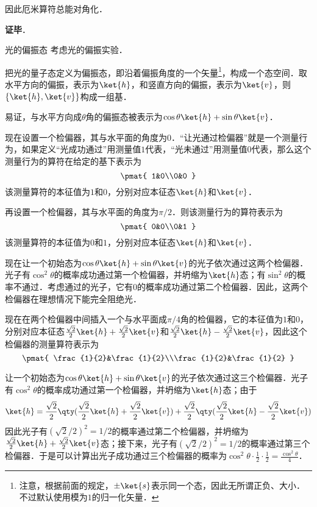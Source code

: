 因此厄米算符总能对角化．

\textbf{证毕}．







\begin{example}{光的偏振态}\label{QMPrcp_ex3}
考虑光的偏振实验．

把光的量子态定义为偏振态，即沿着偏振角度的一个矢量\footnote{注意，根据前面的规定，$\pm\ket{s}$表示同一个态，因此无所谓正负、大小．不过默认使用模为$1$的归一化矢量．}，构成一个态空间．取水平方向的偏振，表示为$\ket{h}$，和竖直方向的偏振，表示为$\ket{v}$，则$\{\ket{h}, \ket{v}\}$构成一组基．

易证，与水平方向成$\theta$角的偏振态被表示为$\cos\theta\ket{h}+\sin\theta\ket{v}$．

现在设置一个检偏器，其与水平面的角度为$0$．“让光通过检偏器”就是一个测量行为，如果定义“光成功通过”用测量值$1$代表，“光未通过”用测量值$0$代表，那么这个测量行为的算符在给定的基下表示为
\begin{equation}
\pmat{
    1&0\\0&0
}
\end{equation}
该测量算符的本征值为$1$和$0$，分别对应本征态$\ket{h}$和$\ket{v}$．

再设置一个检偏器，其与水平面的角度为$\pi/2$．则该测量行为的算符表示为
\begin{equation}
\pmat{
    0&0\\0&1
}
\end{equation}
该测量算符的本征值为$0$和$1$，分别对应本征态$\ket{h}$和$\ket{v}$．

现在让一个初始态为$\cos\theta\ket{h}+\sin\theta\ket{v}$的光子依次通过这两个检偏器．光子有$\cos^2\theta$的概率成功通过第一个检偏器，并坍缩为$\ket{h}$态；有$\sin^2\theta$的概率不通过．考虑通过的光子，它有$0$的概率成功通过第二个检偏器．因此，这两个检偏器在理想情况下能完全阻绝光．

现在在两个检偏器中间插入一个与水平面成$\pi/4$角的检偏器，它的本征值为$1$和$0$，分别对应本征态$\frac{\sqrt{2}}{2}\ket{h}+\frac{\sqrt{2}}{2}\ket{v}$和$\frac{\sqrt{2}}{2}\ket{h}-\frac{\sqrt{2}}{2}\ket{v}$，因此这个检偏器的测量算符表示为
\begin{equation}
\pmat{
    \frac{1}{2}&\frac{1}{2}\\\frac{1}{2}&\frac{1}{2}
}
\end{equation}

让一个初始态为$\cos\theta\ket{h}+\sin\theta\ket{v}$的光子依次通过这三个检偏器．光子有$\cos^2\theta$的概率成功通过第一个检偏器，并坍缩为$\ket{h}$态；由于
\begin{equation}
\ket{h}=\frac{\sqrt{2}}{2}\qty(\frac{\sqrt{2}}{2}\ket{h}+\frac{\sqrt{2}}{2}\ket{v})+\frac{\sqrt{2}}{2}\qty(\frac{\sqrt{2}}{2}\ket{h}-\frac{\sqrt{2}}{2}\ket{v})
\end{equation}
因此光子有$(\sqrt{2}/2)^2=1/2$的概率通过第二个检偏器，并坍缩为$\frac{\sqrt{2}}{2}\ket{h}+\frac{\sqrt{2}}{2}\ket{v}$态；接下来，光子有$(\sqrt{2}/2)^2=1/2$的概率通过第三个检偏器．于是可以计算出光子成功通过三个检偏器的概率为$\cos^2\theta\cdot\frac{1}{2}\cdot\frac{1}{2}=\frac{\cos^2\theta}{4}$．

\end{example}


